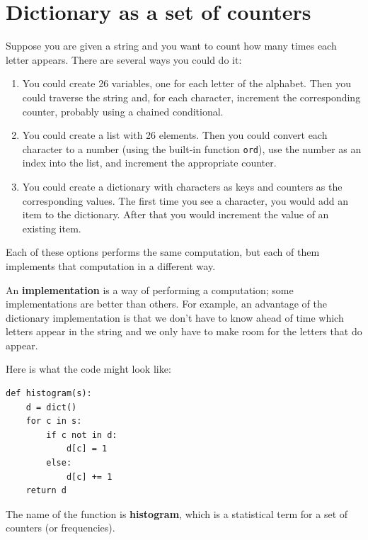 \documentclass[10pt]{book}
\begin{document}
\section{Dictionary as a set of counters}
\label{histogram}


Suppose you are given a string and you want to count how many
times each letter appears.  There are several ways you could do it:

\begin{enumerate}

\item You could create 26 variables, one for each letter of the
alphabet.  Then you could traverse the string and, for each
character, increment the corresponding counter, probably using
a chained conditional.

\item You could create a list with 26 elements.  Then you could
convert each character to a number (using the built-in function
{\tt ord}), use the number as an index into the list, and increment
the appropriate counter.

\item You could create a dictionary with characters as keys
and counters as the corresponding values.  The first time you
see a character, you would add an item to the dictionary.  After
that you would increment the value of an existing item.

\end{enumerate}

Each of these options performs the same computation, but each
of them implements that computation in a different way.


An {\bf implementation} is a way of performing a computation;
some implementations are better than others.  For example,
an advantage of the dictionary implementation is that we don't
have to know ahead of time which letters appear in the string
and we only have to make room for the letters that do appear.

Here is what the code might look like:

\beforeverb
\begin{verbatim}
def histogram(s):
    d = dict()
    for c in s:
        if c not in d:
            d[c] = 1
        else:
            d[c] += 1
    return d
\end{verbatim}
\afterverb
%
The name of the function is {\bf histogram}, which is a statistical
term for a set of counters (or frequencies).
\end{document}

